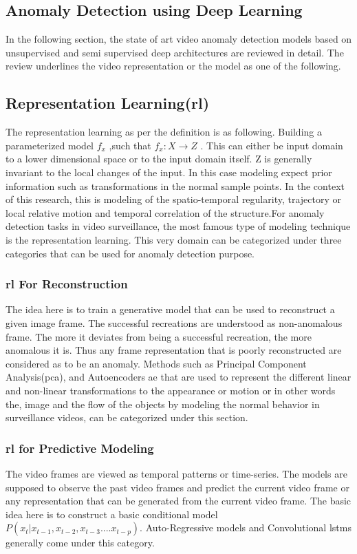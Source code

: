 \documentclass[a4paper,12pt]{report}
\begin{document}
\begin{itemize}
\section{Anomaly Detection using Deep Learning}
In the following section, the state of art video anomaly detection models based on unsupervised and semi supervised deep architectures are reviewed in detail. The review underlines the video representation or the model as one of the following.
\subsection{Representation Learning(\gls{rl}) }
The representation learning as per the definition is as following.  Building a parameterized model $f_x$ ,such that $f_x:X\to Z$ . This can either be input domain to a lower dimensional space or to the input domain itself. Z is generally invariant to the local changes of the input. In this case modeling expect prior information such as transformations in the normal sample points. In the context of this research, this is modeling of the spatio-temporal regularity, trajectory or local relative motion and temporal correlation of the structure.For anomaly detection tasks in video surveillance, the most famous type of modeling technique is the representation learning. This very domain can be categorized under three categories that can be used for anomaly detection purpose. 

\subsubsection{\gls{rl} For Reconstruction}
The idea here is to train a generative model that can be used to reconstruct a given image frame. The successful recreations are understood as non-anomalous frame. The more it deviates from being a successful recreation, the more anomalous it is. Thus any frame representation that is poorly reconstructed are considered as to be an anomaly. Methods such as Principal Component Analysis(\gls{pca}), and Autoencoders \gls{ae} that are used to represent the different linear and non-linear transformations to the appearance or motion or in other words the, image and the flow of the objects by modeling the normal behavior in surveillance videos, can be categorized under this section. 

\subsubsection{\gls{rl} for Predictive Modeling }
The video frames are viewed as temporal patterns or time-series. The models are supposed to observe the past video frames and predict the current video frame or any representation that can be generated from the current video frame. The basic idea here is to construct a basic conditional model $P(x_t|x_{t-1},x_{t-2},x_{t-3}....x_{t-p})$. Auto-Regressive models and Convolutional \gls{lstm}s generally come under this category. 


\end{itemize}
\end{document}
